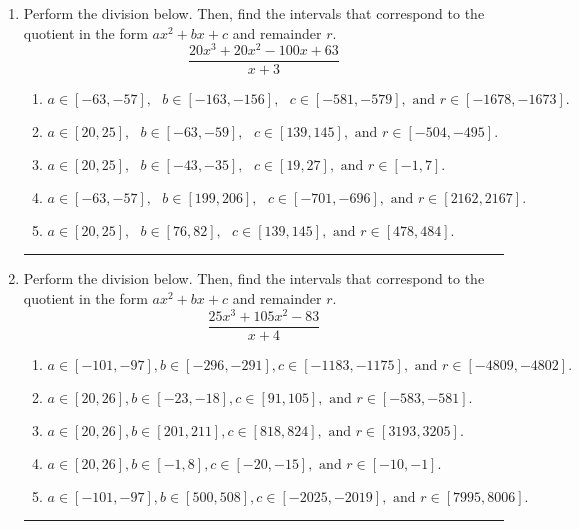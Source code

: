 \documentclass[14pt]{extbook}
\newcommand{\litem}[1]{\item#1\hspace*{-1cm}\rule{\textwidth}{0.4pt}}
\begin{document}
\begin{enumerate}
{\begin{enumerate}[label=\Alph*.]
\end{enumerate} }
\litem{
Perform the division below. Then, find the intervals that correspond to the quotient in the form $ax^2+bx+c$ and remainder $r$.\[ \frac{20x^{3} +20 x^{2} -100 x + 63}{x + 3} \]\begin{enumerate}[label=\Alph*.]
\item \( a \in [-63, -57], \text{   } b \in [-163, -156], \text{   } c \in [-581, -579], \text{   and   } r \in [-1678, -1673]. \)
\item \( a \in [20, 25], \text{   } b \in [-63, -59], \text{   } c \in [139, 145], \text{   and   } r \in [-504, -495]. \)
\item \( a \in [20, 25], \text{   } b \in [-43, -35], \text{   } c \in [19, 27], \text{   and   } r \in [-1, 7]. \)
\item \( a \in [-63, -57], \text{   } b \in [199, 206], \text{   } c \in [-701, -696], \text{   and   } r \in [2162, 2167]. \)
\item \( a \in [20, 25], \text{   } b \in [76, 82], \text{   } c \in [139, 145], \text{   and   } r \in [478, 484]. \)

\end{enumerate} }
\litem{
Perform the division below. Then, find the intervals that correspond to the quotient in the form $ax^2+bx+c$ and remainder $r$.\[ \frac{25x^{3} +105 x^{2} -83}{x + 4} \]\begin{enumerate}[label=\Alph*.]
\item \( a \in [-101, -97], b \in [-296, -291], c \in [-1183, -1175], \text{ and } r \in [-4809, -4802]. \)
\item \( a \in [20, 26], b \in [-23, -18], c \in [91, 105], \text{ and } r \in [-583, -581]. \)
\item \( a \in [20, 26], b \in [201, 211], c \in [818, 824], \text{ and } r \in [3193, 3205]. \)
\item \( a \in [20, 26], b \in [-1, 8], c \in [-20, -15], \text{ and } r \in [-10, -1]. \)
\item \( a \in [-101, -97], b \in [500, 508], c \in [-2025, -2019], \text{ and } r \in [7995, 8006]. \)


\end{enumerate}}
\end{enumerate}
\end{document}
